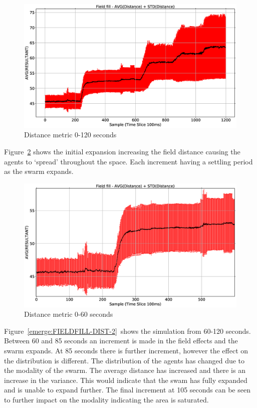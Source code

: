 \begin{figure}[H]
\begin{center}
\includegraphics[width=12cm]{CHAPTER-8/figures/FIELDFILL-DIST}
\end{center}
\caption{Distance metric 0-120 seconds\label{emerge:FIELDFILL-DIST}}
\end{figure}

Figure~\ref{emerge:FIELDFILL-DIST-1} shows the initial expansion increasing the field distance causing the agents to `spread' throughout the space. Each increment having a settling period as the swarm expands.

\begin{figure}[H]
\begin{center}
\includegraphics[width=12cm]{CHAPTER-8/figures/FIELDFILL-DIST-1}
\end{center}
\caption{Distance metric 0-60 seconds\label{emerge:FIELDFILL-DIST-1}}
\end{figure}

Figure~\ref{emerge:FIELDFILL-DIST-2}~shows the simulation from 60-120 seconds. Between 60 and 85 seconds an increment is made in the field effects and the swarm expands. At 85 seconds there is further increment, however the effect on the distribution is different. The distribution of the agents has changed due to the modality of the swarm. The average distance has increased and there is an increase in the variance. This would indicate that the swam has fully expanded and is unable to expand further. The final increment at 105 seconds can be seen to further impact on the modality indicating the area is saturated.

